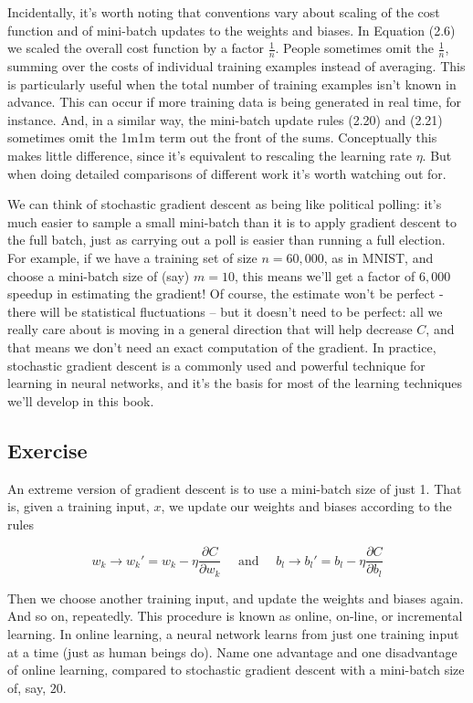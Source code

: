 \documentclass[a4paper,12pt]{report}%
\begin{document}
Incidentally, it's worth noting that conventions vary about scaling of the cost function and of mini-batch updates to the weights and biases. In Equation (2.6) we scaled the overall cost function by a factor $\frac{1}{n}$. People sometimes omit the $\frac{1}{n}$, summing over the costs of individual training examples instead of averaging. This is particularly useful when the total number of training examples isn't known in advance. This can occur if more training data is being generated in real time, for instance. And, in a similar way, the mini-batch update rules (2.20) and (2.21) sometimes omit the 1m1m term out the front of the sums. Conceptually this makes little difference, since it's equivalent to rescaling the learning rate $\eta$. But when doing detailed comparisons of different work it's worth watching out for.

We can think of stochastic gradient descent as being like political polling: it's much easier to sample a small mini-batch than it is to apply gradient descent to the full batch, just as carrying out a poll is easier than running a full election. For example, if we have a training set of size $n=60,000$, as in MNIST, and choose a mini-batch size of (say) $m=10$, this means we'll get a factor of $6,000$ speedup in estimating the gradient! Of course, the estimate won't be perfect - there will be statistical fluctuations -- but it doesn't need to be perfect: all we really care about is moving in a general direction that will help decrease $C$, and that means we don't need an exact computation of the gradient. In practice, stochastic gradient descent is a commonly used and powerful technique for learning in neural networks, and it's the basis for most of the learning techniques we'll develop in this book.

\subsection{Exercise}

An extreme version of gradient descent is to use a mini-batch size of just 1. That is, given a training input, $x$, we update our weights and biases according to the rules
\vspace{-0.5cm}
\begin{center} \begin{equation*}
w_{k} \rightarrow w_{k}' = w_{k} - \eta \frac{\partial C}{\partial w_{k}}  \mbox{~~~~and~~~~} b_{l} \rightarrow  b_{l}' = b_{l} - \eta \frac{\partial C}{\partial b_{l}}
\end{equation*}\end{center}
Then we choose another training input, and update the weights and biases again. And so on, repeatedly. This procedure is known as online, on-line, or incremental learning. In online learning, a neural network learns from just one training input at a time (just as human beings do). Name one advantage and one disadvantage of online learning, compared to stochastic gradient descent with a mini-batch size of, say, $20$.
\end{document}
